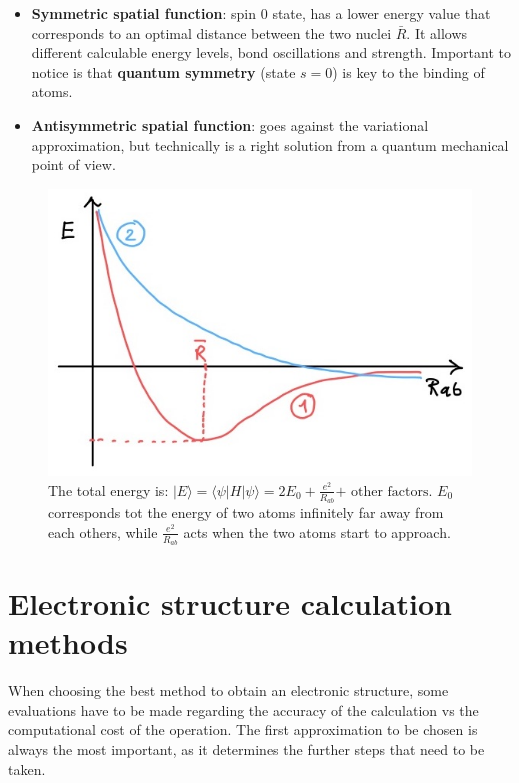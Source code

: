 	\begin{multicols}{2}
	\begin{itemize}
		\item \textbf{Symmetric spatial function}: spin $0$ state, has a lower energy value that corresponds to an optimal distance between the two nuclei $\bar{R}$.
	It allows different calculable energy levels, bond oscillations and strength.
	Important to notice is that \textbf{quantum symmetry} (state $s=0$) is key to the binding of atoms.
		\item \textbf{Antisymmetric spatial function}: goes against the variational approximation, but technically is a right solution from a quantum mechanical point of view.
	\end{itemize}
	\end{multicols}

	\begin{figure}[htbp!]
		\centering
		\includegraphics[scale=0.30]{img_9}
		\caption{The total energy is: $|E \rangle = \langle \psi | H | \psi \rangle = 2E_0 + \frac{e^2}{R_{ab}} \text{+ other factors}$.
							$E_0$ corresponds tot the energy of two atoms infinitely far away from each others, while $\frac{e^2}{R_{ab}}$ acts when the two atoms start to approach.}
		\label{fig:variational}
	\end{figure}

\section{Electronic structure calculation methods}
When choosing the best method to obtain an electronic structure, some evaluations have to be made regarding the accuracy of the calculation vs the computational cost of the operation.
The first approximation to be chosen is always the most important, as it determines the further steps that need to be taken.

